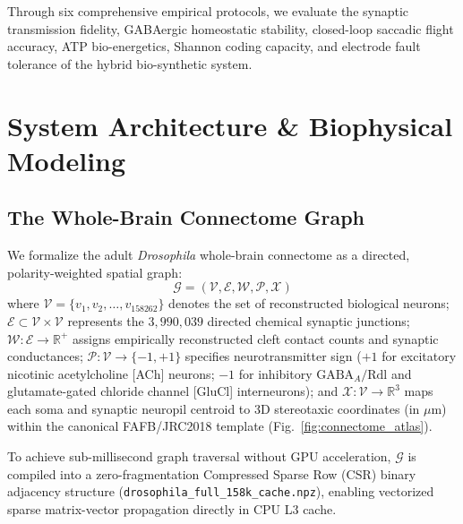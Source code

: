 \documentclass[10pt,twocolumn]{article}
\begin{document}
Through six comprehensive empirical protocols, we evaluate the synaptic transmission fidelity, GABAergic homeostatic stability, closed-loop saccadic flight accuracy, ATP bio-energetics, Shannon coding capacity, and electrode fault tolerance of the hybrid bio-synthetic system.

\section{System Architecture \& Biophysical Modeling}

\subsection{The Whole-Brain Connectome Graph}
We formalize the adult \textit{Drosophila} whole-brain connectome as a directed, polarity-weighted spatial graph:
\begin{equation}
\mathcal{G} = (\mathcal{V}, \mathcal{E}, \mathcal{W}, \mathcal{P}, \mathcal{X})
\end{equation}
where $\mathcal{V} = \{v_1, v_2, \dots, v_{158262}\}$ denotes the set of reconstructed biological neurons; $\mathcal{E} \subset \mathcal{V} \times \mathcal{V}$ represents the $3,990,039$ directed chemical synaptic junctions; $\mathcal{W}: \mathcal{E} \to \mathbb{R}^+$ assigns empirically reconstructed cleft contact counts and synaptic conductances; $\mathcal{P}: \mathcal{V} \to \{-1, +1\}$ specifies neurotransmitter sign ($+1$ for excitatory nicotinic acetylcholine [ACh] neurons; $-1$ for inhibitory $\text{GABA}_A/\text{Rdl}$ and glutamate-gated chloride channel [GluCl] interneurons); and $\mathcal{X}: \mathcal{V} \to \mathbb{R}^3$ maps each soma and synaptic neuropil centroid to 3D stereotaxic coordinates (in $\mu\text{m}$) within the canonical FAFB/JRC2018 template (Fig.~\ref{fig:connectome_atlas}).

To achieve sub-millisecond graph traversal without GPU acceleration, $\mathcal{G}$ is compiled into a zero-fragmentation Compressed Sparse Row (CSR) binary adjacency structure (\texttt{drosophila\_full\_158k\_cache.npz}), enabling vectorized sparse matrix-vector propagation directly in CPU L3 cache.
\end{document}
